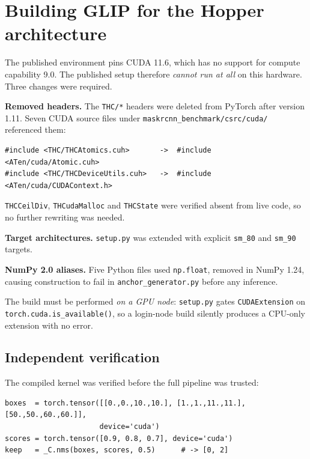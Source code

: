 \documentclass[12pt,a4paper,oneside]{report}
\begin{document}
\section{Building GLIP for the Hopper architecture}

The published environment pins CUDA 11.6, which has no support for compute capability
9.0. The published setup therefore \emph{cannot run at all} on this hardware. Three
changes were required.

\textbf{Removed headers.} The \texttt{THC/*} headers were deleted from PyTorch after
version 1.11. Seven CUDA source files under \texttt{maskrcnn\_benchmark/csrc/cuda/}
referenced them:

\begin{lstlisting}[style=plainlist]
#include <THC/THCAtomics.cuh>       ->  #include <ATen/cuda/Atomic.cuh>
#include <THC/THCDeviceUtils.cuh>   ->  #include <ATen/cuda/CUDAContext.h>
\end{lstlisting}

\texttt{THCCeilDiv}, \texttt{THCudaMalloc} and \texttt{THCState} were verified absent
from live code, so no further rewriting was needed.

\textbf{Target architectures.} \texttt{setup.py} was extended with explicit
\texttt{sm\_80} and \texttt{sm\_90} targets.

\textbf{NumPy 2.0 aliases.} Five Python files used \texttt{np.float}, removed in NumPy
1.24, causing construction to fail in \texttt{anchor\_generator.py} before any
inference.

The build must be performed \emph{on a GPU node}: \texttt{setup.py} gates
\texttt{CUDAExtension} on \texttt{torch.cuda.is\_available()}, so a login-node build
silently produces a CPU-only extension with no error.

\subsection{Independent verification}

The compiled kernel was verified before the full pipeline was trusted:

\begin{lstlisting}[caption={CUDA NMS verified on a hand-checked case. Boxes 0 and 1
overlap above threshold; box 2 is disjoint.}]
boxes  = torch.tensor([[0.,0.,10.,10.], [1.,1.,11.,11.], [50.,50.,60.,60.]],
                      device='cuda')
scores = torch.tensor([0.9, 0.8, 0.7], device='cuda')
keep   = _C.nms(boxes, scores, 0.5)      # -> [0, 2]
\end{lstlisting}
\end{document}
